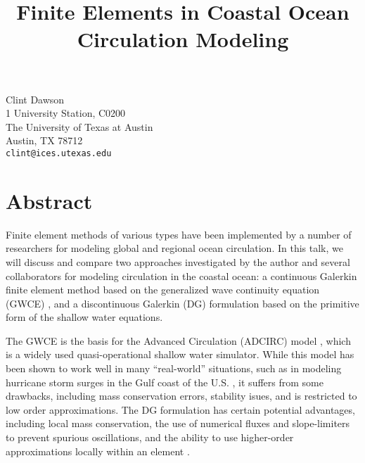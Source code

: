 

\title{Finite Elements in Coastal Ocean Circulation Modeling}
\author{} \institute{} %
\maketitle
\begin{center}
{\large Clint Dawson}\\
1 University Station, C0200 \\
The University of Texas at Austin \\
Austin, TX  78712 \\
{\tt clint@ices.utexas.edu}\\
\end{center}

\section*{Abstract}

Finite element methods of various types have been implemented
by a number of researchers for modeling global
and regional ocean
circulation.  In this talk, we will discuss and compare two approaches investigated by the author and several collaborators 
for modeling circulation in the coastal ocean: 
a continuous Galerkin finite element
method based on the generalized wave continuity equation (GWCE)
 \cite{LynchGray79}, and a discontinuous Galerkin (DG) formulation
\cite{ad1,kub} based on the primitive form of the shallow water equations.  

The GWCE is the basis
for the Advanced Circulation (ADCIRC) model \cite{Luettich92}, which is a widely
used quasi-operational shallow water simulator.    While this model
has been shown to work well in many ``real-world'' situations, such
as in modeling hurricane storm surges in the Gulf coast of the U.S.
\cite{bunya,dietrich,MWR-Gustav}, it suffers from some drawbacks, including mass
conservation errors, stability isues, and is restricted to low order
approximations.  The DG formulation has certain potential advantages,
including local mass conservation, the use of numerical fluxes and slope-limiters
to prevent spurious oscillations, and the ability to use higher-order approximations locally within an element \cite{kub-p}.  

